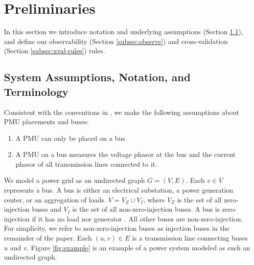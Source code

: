 \section{Preliminaries}
\label{sec:prelim}

In this section we introduce notation and underlying assumptions (Section \ref{subsec:notation-assume}), 
and define our observability (Section \ref{subsec:observe}) and cross-validation (Section \ref{subsec:xval-rules}) rules.


\subsection{System Assumptions, Notation, and Terminology}
\label{subsec:notation-assume}

Consistent with the conventions in \cite{Baldwin93,Brueni05,Abur06,Mili90,Xu04,Xu05}, we make the following assumptions about PMU placements and buses: 
\begin{enumerate}
	\item A PMU can only be placed on a bus.
	\item A PMU on a bus measures the voltage phasor at the bus and the current phasor of all transmission lines connected to it. 
\end{enumerate}

We model a power grid as an undirected graph $G=(V,E)$.  Each $v \in V$ represents a bus.  A bus is either an electrical substation, a power generation center, or an 
aggregation of loads. $V=V_Z \cup V_I$, where $V_Z$ is the set of all zero-injection buses and $V_I$ is the set of all non-zero-injection buses.  A bus is zero-injection if it has no load nor generator \cite{Zhang10}.
All other buses are non-zero-injection.  For simplicity, we refer to non-zero-injection buses as injection buses in the remainder of the paper. 
Each $(u,v) \in E$ is a transmission line connecting buses $u$ and $v$.  Figure \ref{fig:example} is an example of a power system modeled as such an undirected graph.

